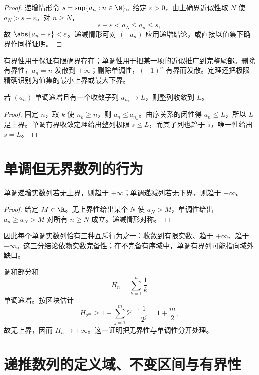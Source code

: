 \begin{proof}
递增情形令 \(s=\sup\{a_n:n\in\N\}\)。给定 \(\varepsilon>0\)，由上确界近似性取 \(N\) 使 \(a_N>s-\varepsilon\)。对 \(n\ge N\)，
\[
 s-\varepsilon<a_N\le a_n\le s,
\]
故 \(\abs{a_n-s}<\varepsilon\)。递减情形可对 \((-a_n)\) 应用递增结论，或直接以值集下确界作同样证明。
\end{proof}

有界性用于保证有限确界存在；单调性用于把某一项的近似推广到完整尾部。删除有界性，\(a_n=n\) 发散到 \(+\infty\)；删除单调性，\((-1)^n\) 有界而发散。定理还把极限精确识别为值集的最小上界或最大下界。

\begin{corollary}
若 \((a_n)\) 单调递增且有一个收敛子列 \(a_{n_k}\to L\)，则整列收敛到 \(L\)。
\end{corollary}

\begin{proof}
固定 \(n\)，取 \(k\) 使 \(n_k\ge n\)，则 \(a_n\le a_{n_k}\)。由序关系的闭性得 \(a_n\le L\)，所以 \(L\) 是上界。单调有界收敛定理给出整列极限 \(s\le L\)，而其子列也趋于 \(s\)，唯一性给出 \(s=L\)。
\end{proof}

\section{单调但无界数列的行为}

\begin{theorem}
单调递增实数列若无上界，则趋于 \(+\infty\)；单调递减列若无下界，则趋于 \(-\infty\)。
\end{theorem}

\begin{proof}
给定 \(M\in\R\)。无上界性给出某个 \(N\) 使 \(a_N>M\)，单调性给出 \(a_n\ge a_N>M\) 对所有 \(n\ge N\) 成立。递减情形对称。
\end{proof}

因此每个单调实数列恰有三种互斥行为之一：收敛到有限实数、趋于 \(+\infty\)、趋于 \(-\infty\)。这三分结论依赖实数完备性；在不完备有序域中，单调有界列可能指向域外缺口。

\begin{example}
调和部分和
\[
 H_n=\sum_{k=1}^n\frac1k
\]
单调递增。按区块估计
\[
 H_{2^m}\ge1+\sum_{j=1}^m2^{j-1}\frac1{2^j}
=1+\frac m2,
\]
故无上界，因而 \(H_n\to+\infty\)。这一证明把无界性与单调性分开处理。
\end{example}

\section{递推数列的定义域、不变区间与有界性}

